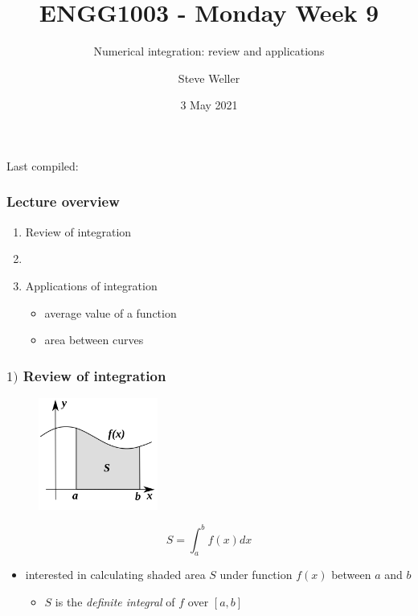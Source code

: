 \documentclass[english,14pt]{beamer}
\title{ENGG1003 - Monday Week 9}
\subtitle{Numerical integration: review and applications}%
\author{Steve Weller}
\institute{University of Newcastle}
\date{3 May 2021}
\begin{document}
\begin{flushleft}
{\scriptsize Last compiled:~\DTMnow}
\vspace*{-5mm}
\end{flushleft}
\framebreak


\begin{frame}[fragile]

\frametitle{Lecture overview}
\begin{enumerate}
	\item Review of integration
	
	\item[]
	
	\item Applications of integration
		\begin{itemize}
			\item average value of a function
			\item area between curves
		\end{itemize}
%	
	
\end{enumerate}

\end{frame}


\begin{frame}[fragile]

\frametitle{$1)$ Review of integration}

\vspace*{-5mm}
\begin{figure}[ht]
	\centering
	\includegraphics[width=0.35\textwidth]{figures/integralArea}
\end{figure}
\vspace*{-3mm}
\[
\boxed{S = \int_a^b f(x) dx}
\]

\vspace*{-3mm}
\begin{itemize}
	\item interested in calculating shaded area $S$ under function $f(x)$ between $a$ and $b$
	\begin{itemize}
		\item $S$ is the \emph{definite integral} of $f$ over $[a,b]$
	\end{itemize}
\end{itemize}

\end{frame}
\end{document}
